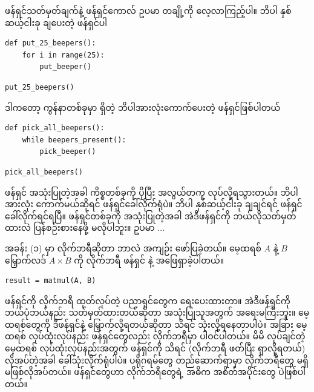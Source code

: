 ဖန်ရှင်သတ်မှတ်ချက်နဲ့ ဖန်ရှင်ကောလ် ဥပမာ တချို့ကို လေ့လာကြည့်ပါ။ ဘိပါ နှစ်ဆယ့်ငါးခု ချပေးတဲ့  ဖန်ရှင်ပါ 
%
\setlength{\fboxsep}{0pt}
\begin{verbatim}
def put_25_beepers():
    for i in range(25):
        put_beeper()
\end{verbatim}
%
\betweenminted{\medskipamount}
%
\setlength{\fboxsep}{0pt}
\begin{verbatim}
put_25_beepers()
\end{verbatim}
%
ဒါကတော့ ကွန်နာတစ်ခုမှာ ရှိတဲ့ ဘိပါအားလုံးကောက်ပေးတဲ့ ဖန်ရှင်ဖြစ်ပါတယ်
%
\setlength{\fboxsep}{0pt}
\begin{verbatim}
def pick_all_beepers():
    while beepers_present():
        pick_beeper()
\end{verbatim}
%
\betweenminted{\medskipamount}
%
\setlength{\fboxsep}{0pt}
\begin{verbatim}
pick_all_beepers()
\end{verbatim}
%

ဖန်ရှင် အသုံးပြုတဲ့အခါ  ကိစ္စတစ်ခုကို ပိုပြီး အလွယ်တကူ လုပ်လို့ရသွားတယ်။ ဘိပါအားလုံး ကောက်မယ်ဆိုရင်  ဖန်ရှင်ခေါ်လိုက်ရုံပဲ။ ဘိပါ နှစ်ဆယ့်ငါးခု ချချင်ရင်  ဖန်ရှင်ခေါ်လိုက်ရင်ရပြီ။ ဖန်ရှင်တစ်ခုကို အသုံးပြုတဲ့အခါ အဲဒီဖန်ရှင်ကို ဘယ်လိုသတ်မှတ်ထားလဲ ပြန်စဉ်းစားနေဖို့ မလိုပါဘူး။ ဥပမာ $...$ 

အခန်း (၁) မှာ လိုက်ဘရီဆိုတာ ဘာလဲ အကျဉ်း ဖော်ပြခဲ့တယ်။    မေ့ထရစ် $A$ နဲ့ $B$ မြှောက်လဒ် $A \times B$ ကို  လိုက်ဘရီ ဖန်ရှင်  နဲ့ အဖြေရှာခဲ့ပါတယ်။ 
%
\setlength{\fboxsep}{0pt}
\begin{verbatim}
result = matmul(A, B)
\end{verbatim}
%
 ဖန်ရှင်ကို လိုက်ဘရီ ထုတ်လုပ်တဲ့ ပညာရှင်တွေက ရေးပေးထားတာ။ အဲဒီဖန်ရှင်ကို ဘယ်ပုံဘယ်နည်း သတ်မှတ်ထားတယ်ဆိုတာ အသုံးပြုသူအတွက် အရေးမကြီးဘူး။ မေ့ထရစ်တွေကို ဒီဖန်ရှင်နဲ့ မြှောက်လို့ရတယ်ဆိုတာ သိရင် သုံးလို့ရနေတာပါပဲ။ အခြား မေ့ထရစ် လုပ်ထုံးလုပ်နည်း ဖန်ရှင်တွေလည်း   လိုက်ဘရီမှာ ပါဝင်ပါတယ်။ မိမိ လုပ်ချင်တဲ့ ‌မေ့ထရစ် လုပ်ထုံးလုပ်နည်းအတွက် ဖန်ရှင်ကို သိရင် (လိုက်ဘရီ  ဖတ်ပြီး ရှာလို့ရတယ်) လိုအပ်တဲ့အခါ ခေါ်သုံးလိုက်ရုံပါပဲ။  ပရိုဂရမ်တွေ တည်ဆောက်ရာမှာ လိုက်ဘရီတွေ မရှိမဖြစ်လိုအပ်တယ်။ ဖန်ရှင်တွေဟာ လိုက်ဘရီတွေရဲ့ အဓိက အစိတ်အပိုင်းတွေ ပဲဖြစ်ပါတယ်။

